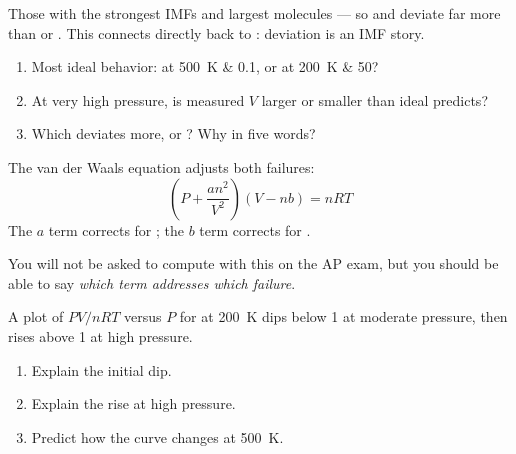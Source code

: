 \documentclass{apchem-notes}
\begin{document}

Those with the strongest IMFs and largest molecules --- so  and
 deviate far more than  or . This connects directly
back to : deviation is an IMF story.


\begin{enumerate}[leftmargin=*,itemsep=0.3em]
  \item Most ideal behavior:  at \SI{500}{\kelvin} \& \SI{0.1}{\atm},
        or  at \SI{200}{\kelvin} \& \SI{50}{\atm}?
  \item At very high pressure, is measured $V$ larger or smaller than ideal
        predicts? 
  \item Which deviates more,  or ? Why in five words?
\end{enumerate}



The van der Waals equation adjusts both failures:
\[
  \left(P + \frac{an^2}{V^2}\right)(V - nb) = nRT
\]
The $a$ term corrects for ; the $b$ term
corrects for .

You will not be asked to compute with this on the AP exam, but you should be
able to say \emph{which term addresses which failure}.


A plot of $PV/nRT$ versus $P$ for  at \SI{200}{\kelvin} dips below
1 at moderate pressure, then rises above 1 at high pressure.

\begin{enumerate}[leftmargin=*,itemsep=0.4em]
  \item Explain the initial dip. 
  \item Explain the rise at high pressure. 
  \item Predict how the curve changes at \SI{500}{\kelvin}.
\end{enumerate}
\end{document}
